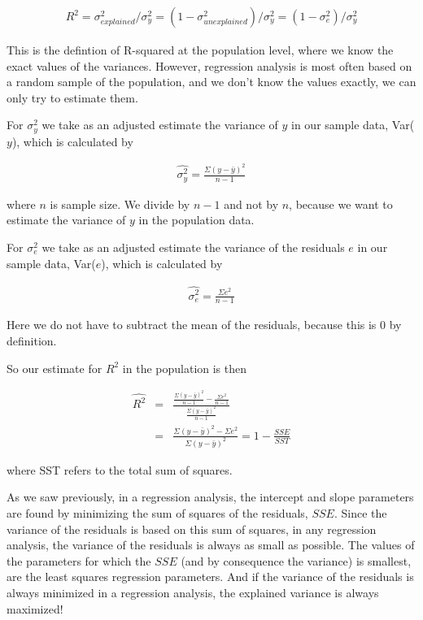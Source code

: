 \documentclass[]{report}\usepackage[]{graphicx}\usepackage[]{color}
\begin{document}
\begin{eqnarray}
R^2 = \sigma^2_{explained}/ \sigma^2_y = (1-\sigma^2_{unexplained})/\sigma^2_y = (1-\sigma^2_e)/\sigma^2_y
\end{eqnarray}

This is the defintion of R-squared at the population level, where we know the exact values of the variances. However, regression analysis is most often based on a random sample of the population, and we don't know the values exactly, we can only try to estimate them.

For $\sigma_y^2$ we take as an adjusted estimate the variance of $y$ in our sample data, Var($y$), which is calculated by


\begin{eqnarray}
\widehat{\sigma_y^2} =  \frac{  \Sigma (y-\bar{y})^2  }{n-1}
\end{eqnarray}

where $n$ is sample size. We divide by $n-1$ and not by $n$, because we want to estimate the variance of $y$ in the population data.

For $\sigma_e^2$ we take as an adjusted estimate the variance of the residuals $e$ in our sample data, Var($e$), which is calculated by


\begin{eqnarray}
\widehat{\sigma_e^2} =  \frac{  \Sigma e^2  }{n-1}
\end{eqnarray}

Here we do not have to subtract the mean of the residuals, because this is 0 by definition.

So our estimate for $R^2$ in the population is then


\begin{eqnarray}
\widehat{R^2} &=&  \frac   { \frac{  \Sigma (y-\bar{y})^2  }{n-1}- \frac{  \Sigma e^2  }{n-1}}{\frac{  \Sigma (y-\bar{y})^2  }{n-1}} \nonumber\\
&=& \frac{ \Sigma (y-\bar{y})^2 - \Sigma e^2}{\Sigma (y-\bar{y})^2} = 1 - \frac{SSE}{SST}
\end{eqnarray}

where SST refers to the total sum of squares.

As we saw previously, in a regression analysis, the intercept and slope parameters are found by minimizing the sum of squares of the residuals, $SSE$. Since the variance of the residuals is based on this sum of squares, in any regression analysis, the variance of the residuals is always as small as possible. The values of the parameters for which the $SSE$ (and by consequence the variance) is smallest, are the least squares regression parameters. And if the variance of the residuals is always minimized in a regression analysis, the explained variance is always maximized!
\end{document}
